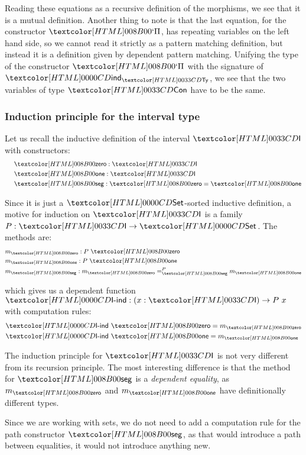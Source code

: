 Reading these equations as a recursive definition of the morphisms, we
see that it is a mutual definition. Another thing to note is that the
last equation, for the constructor $\ttpi$, has repeating variables on
the left hand side, so we cannot read it strictly as a pattern
matching definition, but instead it is a definition given by dependent
pattern matching. Unifying the type of the constructor $\ttpi$ with
the signature of $\tttyind$, we see that the two variables of type
$\ttconty$ have to be the same.

\subsubsection{Induction principle for the interval type}

Let us recall the inductive definition of the interval $\intty$ with
constructors:
\begin{align*}
  \constr{\intzero}{\intty} \\
  \constr{\intone}{\intty} \\
  \constr{\intseg}{\intzero = \intone}
\end{align*}

Since it is just a $\Set$-sorted inductive definition, a motive for
induction on $\intty$ is a family $P : \intty \to \Set$. The methods
are:
\begin{align*}
  &m_{\intzero} : P\ \intzero \\
  &m_{\intone} : P\ \intone \\
  &m_{\intseg} : \pathover{P}{\intseg}{m_{\intzero}}{m_{\intone}}
\end{align*}

which gives us a dependent function $\intind : (x : \intty) \to P\ x$
with computation rules:
\begin{align*}
  &\intind\ \intzero = m_{\intzero} \\
  &\intind\ \intone = m_{\intone} \\
\end{align*}

The induction principle for $\intty$ is not very different from its
recursion principle. The most interesting difference is that the
method for $\intseg$ is a \emph{dependent equality}, as $m_{\intzero}$
and $m_{\intone}$ have definitionally different types.

Since we are working with sets, we do not need to add a computation
rule for the path constructor $\intseg$, as that would introduce a
path between equalities, \ie it would not introduce anything new.

